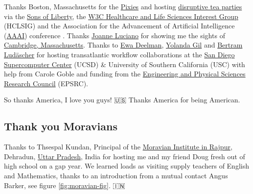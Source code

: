\documentclass[
]{book}
\begin{document}
Thanks Boston, Massachusetts for the \href{https://en.wikipedia.org/wiki/Pixies_(band)}{Pixies} and hosting \href{https://en.wikipedia.org/wiki/Boston_Tea_Party}{disruptive tea parties} via the \href{https://en.wikipedia.org/wiki/Sons_of_Liberty}{Sons of Liberty}, the \href{https://www.w3.org/wiki/HCLSIG}{W3C Healthcare and Life Sciences Interest Group} (HCLSIG) and the Association for the Advancement of Artificial Intelligence (\href{https://en.wikipedia.org/wiki/Association_for_the_Advancement_of_Artificial_Intelligence}{AAAI}) conference \citep{aaai}. Thanks \href{https://scholar.google.com/citations?user=wWYH1IMAAAAJ}{Joanne Luciano} for showing me the sights of \href{https://en.wikipedia.org/wiki/Cambridge,_Massachusetts}{Cambridge, Massachusetts}. Thanks to \href{https://twitter.com/ewadeelman}{Ewa Deelman}, \href{https://en.wikipedia.org/wiki/Yolanda_Gil}{Yolanda Gil} and \href{https://ischool.illinois.edu/people/bertram-ludascher}{Bertram Ludäscher} for hosting transatlantic workflow collaborations at the \href{https://en.wikipedia.org/wiki/San_Diego_Supercomputer_Center}{San Diego Supercomputer Center} (UCSD) \& University of Southern California (USC) with help from Carole Goble and funding from the \href{https://en.wikipedia.org/wiki/Engineering_and_Physical_Sciences_Research_Council}{Engineering and Physical Sciences Research Council} (EPSRC).

So thanks America, I love you guys! 🇺🇸 Thanks America for being American. 🙏

\hypertarget{moravians}{%
\subsection{Thank you Moravians}\label{moravians}}

Thanks to Thsespal Kundan, Principal of the \href{https://moravianinstitute.com/}{Moravian Institute in Rajpur}, Dehradun, \href{https://en.wikipedia.org/wiki/Uttar_Pradesh}{Uttar Pradesh}, India for hosting me and my friend Doug fresh out of high school on a gap year. We learned loads as visiting supply teachers of English and Mathematics, thanks to an introduction from a mutual contact Angus Barker, see figure \ref{fig:moravian-fig}. 🇮🇳
\end{document}
